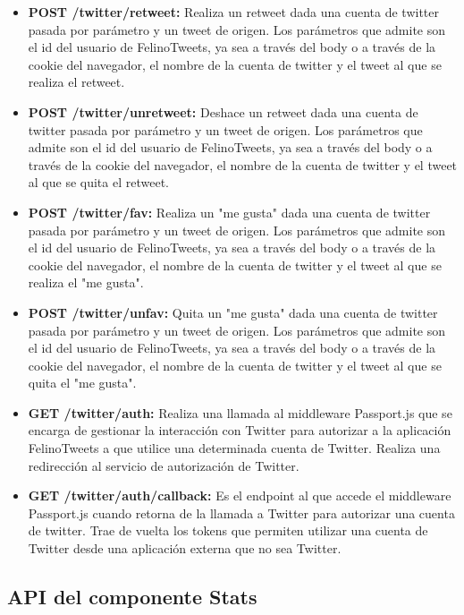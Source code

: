 \documentclass[a4paper]{article}
\begin{document}
\begin{itemize}
		\item \textbf{POST /twitter/retweet:} Realiza un retweet dada una cuenta de twitter pasada por parámetro y un tweet de origen. Los parámetros que admite son el id del usuario de FelinoTweets, ya sea a través del body o a través de la cookie del navegador, el nombre de la cuenta de twitter y el tweet al que se realiza el retweet.
		\newpage
		\item \textbf{POST /twitter/unretweet:} Deshace un retweet dada una cuenta de twitter pasada por parámetro y un tweet de origen. Los parámetros que admite son el id del usuario de FelinoTweets, ya sea a través del body o a través de la cookie del navegador, el nombre de la cuenta de twitter y el tweet al que se quita el retweet.
		
		\item \textbf{POST /twitter/fav:} Realiza un "me gusta" dada una cuenta de twitter pasada por parámetro y un tweet de origen. Los parámetros que admite son el id del usuario de FelinoTweets, ya sea a través del body o a través de la cookie del navegador, el nombre de la cuenta de twitter y el tweet al que se realiza el "me gusta".
		
		\item \textbf{POST /twitter/unfav:} Quita un "me gusta" dada una cuenta de twitter pasada por parámetro y un tweet de origen. Los parámetros que admite son el id del usuario de FelinoTweets, ya sea a través del body o a través de la cookie del navegador, el nombre de la cuenta de twitter y el tweet al que se quita el "me gusta".
		
		\item \textbf{GET /twitter/auth:} Realiza una llamada al middleware Passport.js que se encarga de gestionar la interacción con Twitter para autorizar a la aplicación FelinoTweets a que utilice una determinada cuenta de Twitter. Realiza una redirección al servicio de autorización de Twitter.
		
		\item \textbf{GET /twitter/auth/callback:} Es el endpoint al que accede el middleware Passport.js cuando retorna de la llamada a Twitter para autorizar una cuenta de twitter. Trae de vuelta los tokens que permiten utilizar una cuenta de Twitter desde una aplicación externa que no sea Twitter.
	\end{itemize}
	
	\subsection{API del componente Stats}
	
\end{document}

